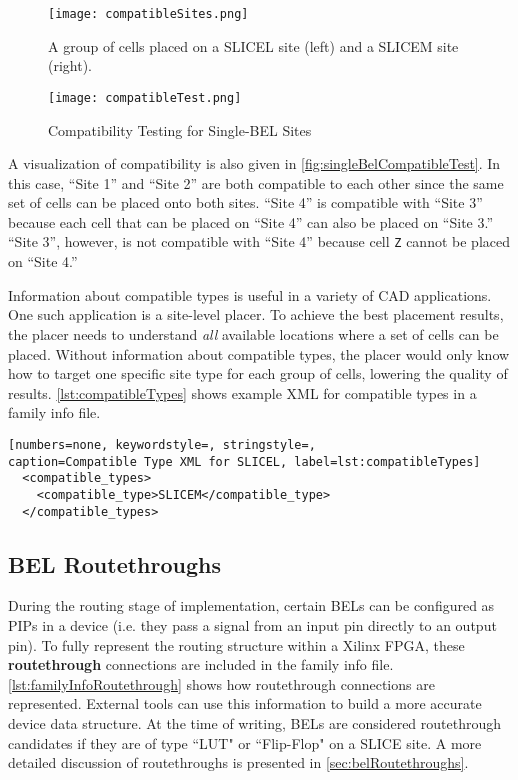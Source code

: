 \begin{figure}[h!]
  \centering
  \texttt{[image: compatibleSites.png]}
  \caption{A group of cells placed on a SLICEL site (left) and a SLICEM
  site (right).}
  \label{fig:sliceCompatibility}
\end{figure}

\begin{figure}[b!]
  \centering
  \texttt{[image: compatibleTest.png]}
  \caption{Compatibility Testing for Single-BEL Sites}
  \label{fig:singleBelCompatibleTest}
\end{figure}

A visualization of compatibility is also given in
\autoref{fig:singleBelCompatibleTest}. In this case, ``Site 1'' and ``Site 2''
are both compatible to each other since the same set of cells can be placed
onto both sites. ``Site 4'' is compatible with ``Site 3'' because each cell that
can be placed on ``Site 4'' can also be placed on ``Site 3.'' ``Site 3'', however, is
not compatible with ``Site 4'' because cell \texttt{Z} cannot be placed on
``Site 4.''

Information about compatible types is useful in a variety of CAD applications.
One such application is a site-level placer. To achieve the best
placement results, the placer needs to understand \emph{all} available
locations where a set of cells can be placed. Without information about
compatible types, the placer would only know how to target one specific site
type for each group of cells, lowering the quality of results.
\autoref{lst:compatibleTypes} shows example XML for compatible types in a
family info file.

\begin{lstlisting}[numbers=none, keywordstyle=, stringstyle=,
caption=Compatible Type XML for SLICEL, label=lst:compatibleTypes]
  <compatible_types>
    <compatible_type>SLICEM</compatible_type>
  </compatible_types>
\end{lstlisting}

\subsection{BEL Routethroughs}
During the routing stage of implementation, certain BELs can be configured as
PIPs in a device (i.e. they pass a signal from an input pin directly to an
output pin). To fully represent the routing structure within
a Xilinx FPGA, these \textbf{routethrough} connections are included in the
family info file. \autoref{lst:familyInfoRoutethrough} shows how routethrough
connections are represented. External tools can use this information to
build a more accurate device data structure. At the time of writing, BELs are
considered routethrough candidates if they are of type ``LUT" or ``Flip-Flop"
on a SLICE site. A more detailed discussion of routethroughs is presented in
\autoref{sec:belRoutethroughs}.

